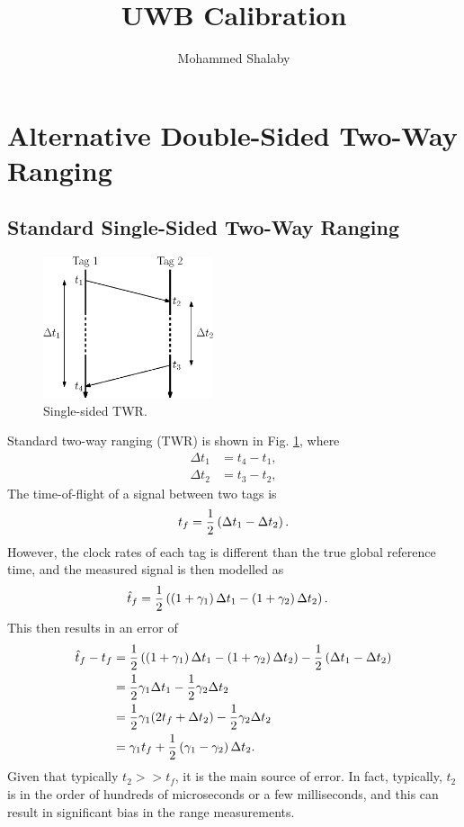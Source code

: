\documentclass{decar-wsd}    %
\title{UWB Calibration}
\author{Mohammed Shalaby}
\begin{document}
\maketitle

\section{Alternative Double-Sided Two-Way Ranging}

\subsection{Standard Single-Sided Two-Way Ranging}

\begin{figure}
    \centering
    \includegraphics[width=5cm]{figs/standard_twr.eps}
    \caption{Single-sided TWR.}
    \label{fig:ss_twr}
\end{figure}

Standard two-way ranging (TWR) is shown in Fig. \ref{fig:ss_twr}, where
\begin{align}
    \Delta t_1 &= t_4 - t_1, \\
    \Delta t_2 &= t_3 - t_2,
\end{align}
The time-of-flight of a signal between two tags is
\begin{align}
    t_f = \frac{1}{2} \left( \Delta t_1 - \Delta t_2 \right).
\end{align}
However, the clock rates of each tag is different than the true global reference time, and the measured signal is then modelled as
\begin{align}
    \hat{t}_f &= \frac{1}{2} \left( \left(1 + \gamma_1 \right) \Delta t_1 - \left( 1 + \gamma_2 \right) \Delta t_2 \right).
\end{align}
This then results in an error of
\begin{align}
    \hat{t}_f - t_f &= \frac{1}{2} \left( \left(1 + \gamma_1 \right) \Delta t_1 - \left( 1 + \gamma_2 \right) \Delta t_2 \right) -  \frac{1}{2} \left( \Delta t_1 - \Delta t_2 \right) \\
    &= \frac{1}{2} \gamma_1 \Delta t_1 - \frac{1}{2} \gamma_2 \Delta t_2 \\
    &= \frac{1}{2} \gamma_1 (2 t_f + \Delta t_2) - \frac{1}{2} \gamma_2 \Delta t_2 \\
    &= \gamma_1 t_f + \frac{1}{2} \left( \gamma_1 - \gamma_2 \right) \Delta t_2.
\end{align}
Given that typically $t_2 >> t_f$, it is the main source of error. In fact, typically, $t_2$ is in the order of hundreds of microseconds or a few milliseconds, and this can result in significant bias in the range measurements.
\end{document}
